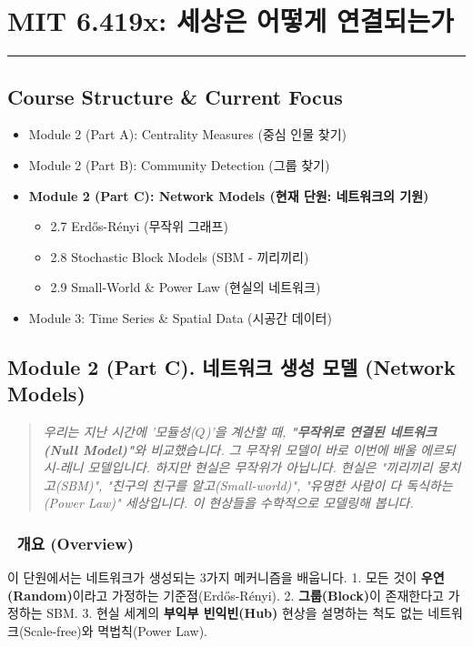 \documentclass[11pt,a4paper]{book}
\theoremstyle{definition}
\begin{document}
\chapter{MIT 6.419x: 세상은 어떻게 연결되는가}
\label{ch:lecture6}


\vspace{1cm}
\hrule
\vspace{1cm}

\section*{Course Structure \& Current Focus}
\begin{itemize}
    \item Module 2 (Part A): Centrality Measures (중심 인물 찾기)
    \item Module 2 (Part B): Community Detection (그룹 찾기)
    \item \textbf{\textcolor{mainblue}{Module 2 (Part C): Network Models (현재 단원: 네트워크의 기원)}}
    \begin{itemize}
        \item 2.7 Erdős-Rényi (무작위 그래프)
        \item 2.8 Stochastic Block Models (SBM - 끼리끼리)
        \item 2.9 Small-World \& Power Law (현실의 네트워크)
    \end{itemize}
    \item Module 3: Time Series \& Spatial Data (시공간 데이터)
\end{itemize}


\section{Module 2 (Part C). 네트워크 생성 모델 (Network Models)}

\begin{quote}
\textit{우리는 지난 시간에 '모듈성($Q$)'을 계산할 때, \textbf{"무작위로 연결된 네트워크(Null Model)"}와 비교했습니다. 그 무작위 모델이 바로 이번에 배울 에르되시-레니 모델입니다. 하지만 현실은 무작위가 아닙니다. 현실은 "끼리끼리 뭉치고(SBM)", "친구의 친구를 알고(Small-world)", "유명한 사람이 다 독식하는(Power Law)" 세상입니다. 이 현상들을 수학적으로 모델링해 봅니다.}
\end{quote}

\subsection*{📌 개요 (Overview)}
이 단원에서는 네트워크가 생성되는 3가지 메커니즘을 배웁니다.
1. 모든 것이 \textbf{우연(Random)}이라고 가정하는 기준점(Erdős-Rényi).
2. \textbf{그룹(Block)}이 존재한다고 가정하는 SBM.
3. 현실 세계의 \textbf{부익부 빈익빈(Hub)} 현상을 설명하는 척도 없는 네트워크(Scale-free)와 멱법칙(Power Law).
\end{document}
